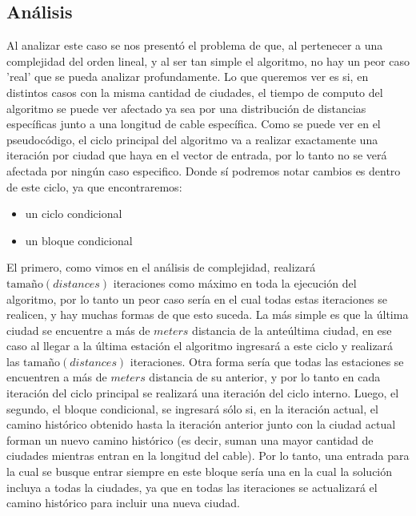 \documentclass{article}
\theoremstyle{definition}
\theoremstyle{remark}
\begin{document}

\subsection{Análisis}

Al analizar este caso se nos presentó el problema de que, al pertenecer a una complejidad del orden lineal, y al ser tan simple el algoritmo, no hay un peor caso 'real' que se pueda analizar profundamente. Lo que queremos ver es si, en distintos casos con la misma cantidad de ciudades, el tiempo de computo del algoritmo se puede ver afectado ya sea por una distribución de distancias específicas junto a una longitud de cable específica.
Como se puede ver en el pseudocódigo, el ciclo principal del algoritmo va a realizar exactamente una iteración por ciudad que haya en el vector de entrada, por lo tanto no se verá afectada por ningún caso especifico. Donde sí podremos notar cambios es dentro de este ciclo, ya que encontraremos:
\begin{itemize}
\item un ciclo condicional
\item un bloque condicional
\end{itemize}
El primero, como vimos en el análisis de complejidad, realizará $\text{tamaño}(distances)$ iteraciones como máximo en toda la ejecución del algoritmo, por lo tanto un peor caso sería en el cual todas estas iteraciones se realicen, y hay muchas formas de que esto suceda. La más simple es que la última ciudad se encuentre a más de $meters$ distancia de la anteúltima ciudad, en ese caso al llegar a la última estación el algoritmo ingresará a este ciclo y realizará las $\text{tamaño}(distances)$ iteraciones. Otra forma sería que todas las estaciones se encuentren a más de $meters$ distancia de su anterior, y por lo tanto en cada iteración del ciclo principal se realizará una iteración del ciclo interno.
Luego, el segundo, el bloque condicional, se ingresará sólo si, en la iteración actual, el camino histórico obtenido hasta la iteración anterior junto con la ciudad actual forman un nuevo camino histórico (es decir, suman una mayor cantidad de ciudades mientras entran en la longitud del cable). Por lo tanto, una entrada para la cual se busque entrar siempre en este bloque sería una en la cual la solución incluya a todas la ciudades, ya que en todas las iteraciones se actualizará el camino histórico para incluir una nueva ciudad.\par
\end{document}

